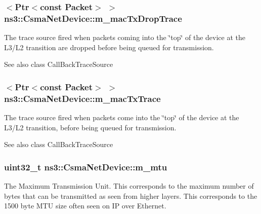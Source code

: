 \subsubsection[{\texorpdfstring{m\+\_\+mac\+Tx\+Drop\+Trace}{m_macTxDropTrace}}]{$<${\bf Ptr}$<$const {\bf Packet}$>$ $>$ ns3\+::\+Csma\+Net\+Device\+::m\+\_\+mac\+Tx\+Drop\+Trace\hspace{0.3cm}{\ttfamily [private]}}\hypertarget{classns3_1_1CsmaNetDevice_ac6e2a81eedea1fa443600bbac37842b2}{}\label{classns3_1_1CsmaNetDevice_ac6e2a81eedea1fa443600bbac37842b2}
The trace source fired when packets coming into the \char`\"{}top\char`\"{} of the device at the L3/\+L2 transition are dropped before being queued for transmission.

\begin{DoxySeeAlso}{See also}
class Call\+Back\+Trace\+Source 
\end{DoxySeeAlso}
\subsubsection[{\texorpdfstring{m\+\_\+mac\+Tx\+Trace}{m_macTxTrace}}]{$<${\bf Ptr}$<$const {\bf Packet}$>$ $>$ ns3\+::\+Csma\+Net\+Device\+::m\+\_\+mac\+Tx\+Trace\hspace{0.3cm}{\ttfamily [private]}}\hypertarget{classns3_1_1CsmaNetDevice_acd8f03ea3f02befd6caa2b07065ac80a}{}\label{classns3_1_1CsmaNetDevice_acd8f03ea3f02befd6caa2b07065ac80a}
The trace source fired when packets come into the \char`\"{}top\char`\"{} of the device at the L3/\+L2 transition, before being queued for transmission.

\begin{DoxySeeAlso}{See also}
class Call\+Back\+Trace\+Source 
\end{DoxySeeAlso}
\subsubsection[{\texorpdfstring{m\+\_\+mtu}{m_mtu}}]{\setlength{\rightskip}{0pt plus 5cm}uint32\+\_\+t ns3\+::\+Csma\+Net\+Device\+::m\+\_\+mtu\hspace{0.3cm}{\ttfamily [private]}}\hypertarget{classns3_1_1CsmaNetDevice_a4b2e70ee2ee42f63f3756728ec592bc1}{}\label{classns3_1_1CsmaNetDevice_a4b2e70ee2ee42f63f3756728ec592bc1}
The Maximum Transmission Unit. This corresponds to the maximum number of bytes that can be transmitted as seen from higher layers. This corresponds to the 1500 byte M\+TU size often seen on IP over Ethernet. 
